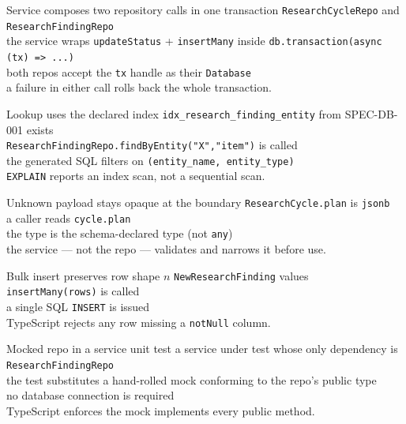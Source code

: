 \begin{scenario}{Service composes two repository calls in one transaction}
\Given \texttt{ResearchCycleRepo} and \texttt{ResearchFindingRepo} \\
\When the service wraps \texttt{updateStatus} + \texttt{insertMany} inside
\texttt{db.transaction(async (tx) => ...)} \\
\Then both repos accept the \texttt{tx} handle as their \texttt{Database} \\
\And a failure in either call rolls back the whole transaction.
\end{scenario}

\begin{scenario}{Lookup uses the declared index}
\Given \texttt{idx\_research\_finding\_entity} from SPEC-DB-001 exists \\
\When \texttt{ResearchFindingRepo.findByEntity("X","item")} is called \\
\Then the generated SQL filters on \texttt{(entity\_name, entity\_type)} \\
\And \texttt{EXPLAIN} reports an index scan, not a sequential scan.
\end{scenario}

\begin{scenario}{Unknown payload stays opaque at the boundary}
\Given \texttt{ResearchCycle.plan} is \texttt{jsonb} \\
\When a caller reads \texttt{cycle.plan} \\
\Then the type is the schema-declared type (not \texttt{any}) \\
\And the service --- not the repo --- validates and narrows it before use.
\end{scenario}

\begin{scenario}{Bulk insert preserves row shape}
\Given \(n\) \texttt{NewResearchFinding} values \\
\When \texttt{insertMany(rows)} is called \\
\Then a single SQL \texttt{INSERT} is issued \\
\And TypeScript rejects any row missing a \texttt{notNull} column.
\end{scenario}

\begin{scenario}{Mocked repo in a service unit test}
\Given a service under test whose only dependency is \texttt{ResearchFindingRepo} \\
\When the test substitutes a hand-rolled mock conforming to the repo's public
type \\
\Then no database connection is required \\
\And TypeScript enforces the mock implements every public method.
\end{scenario}

